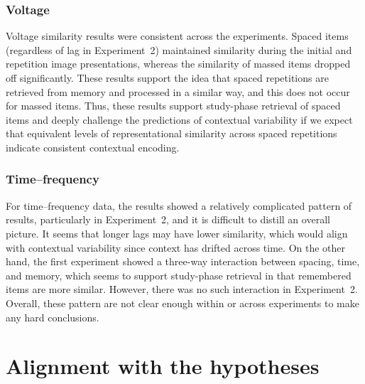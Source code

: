 \subsubsection{Voltage}

Voltage similarity results were consistent across the experiments.  Spaced items (regardless of lag in Experiment~2) maintained similarity during the initial and repetition image presentations, whereas the similarity of massed items dropped off significantly.  These results support the idea that spaced repetitions are retrieved from memory and processed in a similar way, and this does not occur for massed items.  Thus, these results support study-phase retrieval of spaced items and deeply challenge the predictions of contextual variability if we expect that equivalent levels of representational similarity across spaced repetitions indicate consistent contextual encoding.

\subsubsection{Time--frequency}

For time--frequency data, the results showed a relatively complicated pattern of results, particularly in Experiment~2, and it is difficult to distill an overall picture.  It seems that longer lags may have lower similarity, which would align with contextual variability since context has drifted across time.
On the other hand, the first experiment showed a three-way interaction between spacing, time, and memory, which seems to support study-phase retrieval in that remembered items are more similar.  However, there was no such interaction in Experiment~2.  Overall, these pattern are not clear enough within or across experiments to make any hard conclusions.




\section{Alignment with the hypotheses}


